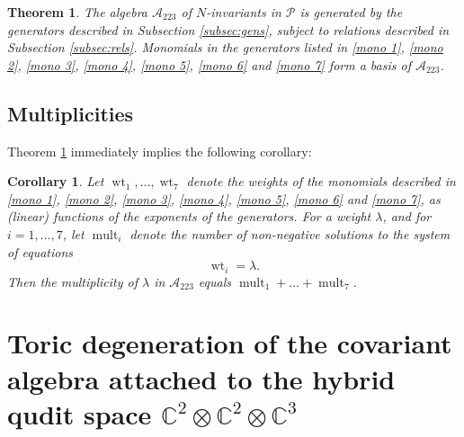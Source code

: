 \documentclass[reqno,11pt]{amsart}
\newtheorem{thm}[equation]{Theorem}
\newtheorem{cor}[equation]{Corollary}
\theoremstyle{remark}
\theoremstyle{definition}
\numberwithin{equation}{section}
\newcommand{\mult}{\operatorname{mult}}
\newcommand\la{{\lambda}}
\newcommand{\bbC}{\mathbb{C}}
\newcommand{\Pol}{\mathcal{P}}
\newcommand{\cA}{\mathcal{A}}
\newcommand{\wt}{\operatorname{wt}}
\begin{document}
\begin{thm} 
	\label{basis 223}
	The algebra $\cA_{223}$ of $N$-invariants in $\Pol$ is generated by the generators described in Subsection \ref{subsec:gens}, subject to relations described in Subsection \ref{subsec:rels}. Monomials in the generators listed in \eqref{mono 1}, \eqref{mono 2}, \eqref{mono 3}, \eqref{mono 4}, \eqref{mono 5}, \eqref{mono 6} and \eqref{mono 7} form a basis of  $\cA_{223}$.	
\end{thm}

\subsection{Multiplicities}
Theorem \ref{basis 223} immediately implies the following corollary:

\begin{cor} Let $\wt_1,\dots,\wt_7$ denote the weights of the monomials described in \eqref{mono 1}, \eqref{mono 2}, \eqref{mono 3}, \eqref{mono 4}, \eqref{mono 5}, \eqref{mono 6} and \eqref{mono 7}, as (linear) functions of the exponents of the generators. For a weight $\la$, and for $i=1,\dots,7$, let $\mult_i$ denote the number of non-negative solutions to the system of equations
\[
\wt_i=\la.
\] 
Then the multiplicity of $\la$ in $\cA_{223}$ equals $\mult_1+\dots+\mult_7$.
\end{cor}


\section{Toric degeneration of the covariant algebra attached to the  hybrid qudit space
$\bbC^2\otimes\bbC^2\otimes\bbC^3$}
\end{document}

